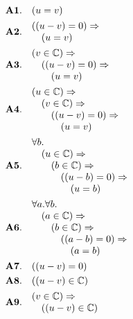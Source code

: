 \documentclass[11pt]{article}
\theoremstyle{plain}
\begin{document}
\begin{align*}
  \mathbf{A1.}\quad & (u = v) \\
  \mathbf{A2.}\quad & \begin{array}{@{}l@{}} ((u - v) = 0) \Rightarrow  \\ \quad (u = v) \end{array} \\
  \mathbf{A3.}\quad & \begin{array}{@{}l@{}} (v \in \mathbb{C}) \Rightarrow  \\ \quad ((u - v) = 0) \Rightarrow  \\ \quad \quad (u = v) \end{array} \\
  \mathbf{A4.}\quad & \begin{array}{@{}l@{}} (u \in \mathbb{C}) \Rightarrow  \\ \quad (v \in \mathbb{C}) \Rightarrow  \\ \quad \quad ((u - v) = 0) \Rightarrow  \\ \quad \quad \quad (u = v) \end{array} \\
  \mathbf{A5.}\quad & \begin{array}{@{}l@{}} \forall b. \\ \quad (u \in \mathbb{C}) \Rightarrow  \\ \quad \quad (b \in \mathbb{C}) \Rightarrow  \\ \quad \quad \quad ((u - b) = 0) \Rightarrow  \\ \quad \quad \quad \quad (u = b) \end{array} \\
  \mathbf{A6.}\quad & \begin{array}{@{}l@{}} \forall a. \forall b. \\ \quad (a \in \mathbb{C}) \Rightarrow  \\ \quad \quad (b \in \mathbb{C}) \Rightarrow  \\ \quad \quad \quad ((a - b) = 0) \Rightarrow  \\ \quad \quad \quad \quad (a = b) \end{array} \\
  \mathbf{A7.}\quad & ((u - v) = 0) \\
  \mathbf{A8.}\quad & ((u - v) \in \mathbb{C}) \\
  \mathbf{A9.}\quad & \begin{array}{@{}l@{}} (v \in \mathbb{C}) \Rightarrow  \\ \quad ((u - v) \in \mathbb{C}) \end{array} \\

\end{align*}
\end{document}
